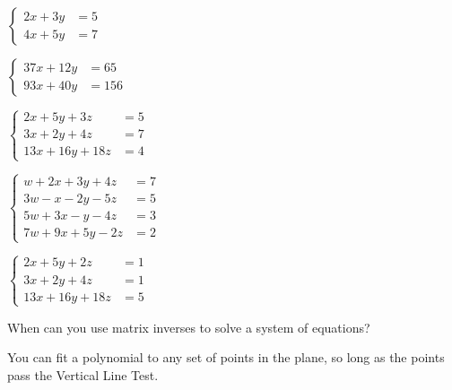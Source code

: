 \documentclass[../gatm_answers.tex]{subfiles}
\begin{document}
\begin{inner_problem}[start=1]
\item $\begin{cases} 2x+3y &= 5 \\ 4x+5y &= 7 \end{cases}$
\end{inner_problem}

\begin{inner_problem}
\item $\begin{cases} 37x+12y &= 65 \\ 93x+40y &= 156\end{cases}$
\end{inner_problem}

\begin{inner_problem}
\item $\begin{cases} 2x+5y+3z &= 5 \\ 3x+2y+4z &= 7 \\ 13x+16y+18z &= 4\end{cases}$
\end{inner_problem}

\begin{inner_problem}
\item $\begin{cases} w + 2x + 3y + 4z &= 7 \\ 3w-x-2y-5z&=5 \\ 5w+3x-y-4z&=3 \\ 7w+9x+5y-2z&=2\end{cases}$
\end{inner_problem}

\begin{inner_problem}
\item $\begin{cases} 2x+5y+2z &= 1 \\ 3x+2y+4z &= 1 \\ 13x+16y+18z &= 5 \end{cases}$
\end{inner_problem}

\begin{inner_problem}
\item When can you use matrix inverses to solve a system of equations?
\end{inner_problem}

\begin{outer_problem}
\item You can fit a polynomial to any set of points in the plane, so long as the points pass the Vertical Line Test.
\end{outer_problem}
\end{document}
